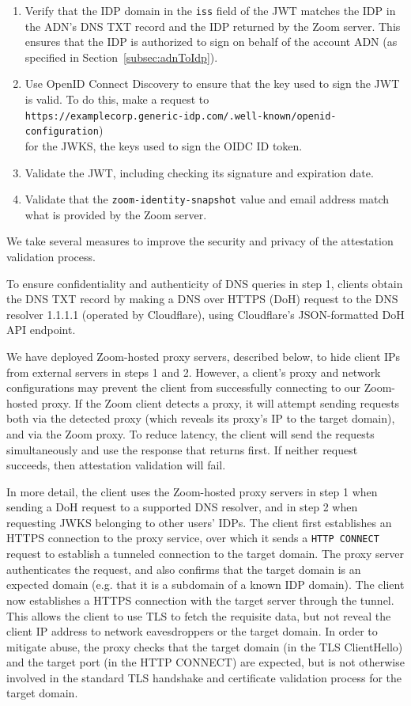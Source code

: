 \begin{enumerate}
\item Verify that the IDP domain in the \texttt{iss} field of the JWT matches the IDP in the ADN's
    DNS TXT record and the IDP returned by the Zoom server. This ensures that the IDP is authorized
    to sign on behalf of the account ADN (as specified in Section~\ref{subsec:adnToIdp}).
\item Use OpenID Connect Discovery to ensure that the key used to sign the JWT is valid. To do this,
    make a request to \\
    \texttt{https://examplecorp.generic-idp.com/.well-known/openid-configuration}) \\
    for the JWKS, the keys used to sign the OIDC ID token.
\item Validate the JWT, including checking its signature and expiration date.
\item Validate that the \texttt{zoom-identity-snapshot} value and email address match what is
    provided by the Zoom server.
\end{enumerate}

We take several measures to improve the security and privacy of the attestation validation process.

To ensure confidentiality and authenticity of DNS queries in step 1, clients obtain the DNS TXT
record by making a DNS over HTTPS (DoH) request to the DNS resolver 1.1.1.1 (operated by
Cloudflare), using Cloudflare's JSON-formatted DoH API endpoint.

We have deployed Zoom-hosted proxy servers, described below, to hide client IPs from external
servers in steps 1 and 2. However, a client's proxy and network configurations may prevent the
client from successfully connecting to our Zoom-hosted proxy. If the Zoom client detects a proxy, it
will attempt sending requests both via the detected proxy (which reveals its proxy's IP to the
target domain), and via the Zoom proxy. To reduce latency, the client will send the requests
simultaneously and use the response that returns first. If neither request succeeds, then
attestation validation will fail. 

In more detail, the client uses the Zoom-hosted proxy servers in step 1 when sending a DoH request
to a supported DNS resolver, and in step 2 when requesting JWKS belonging to other users' IDPs. The
client first establishes an HTTPS connection to the proxy service, over which it sends a
\texttt{HTTP CONNECT} request to establish a tunneled connection to the target domain. The proxy
server authenticates the request, and also confirms that the target domain is an expected domain
(e.g. that it is a subdomain of a known IDP domain). The client now establishes a HTTPS connection
with the target server through the tunnel. This allows the client to use TLS to fetch the requisite
data, but not reveal the client IP address to network eavesdroppers or the target domain. In order
to mitigate abuse, the proxy checks that the target domain (in the TLS ClientHello) and the target
port (in the HTTP CONNECT) are expected, but is not otherwise involved in the standard TLS handshake
and certificate validation process for the target domain.


